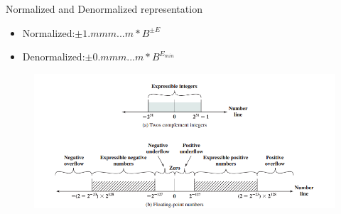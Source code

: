 \documentclass[11pt]{beamer}
\begin{document}
\begin{frame}{Normalized and Denormalized representation}
\begin{itemize}
\item Normalized:$\pm{1.mmm...m}*B^{\pm{E}}$\\
\item Denormalized:$\pm{0.mmm...m}*B^{E_{min}}$
\end{itemize}
\begin{center}
    \begin{figure}[htp]
    \begin{center}
     \includegraphics[scale=.5]{image/fig2}
    \end{center}
    \label{reffig2}
    \end{figure}
\end{center}
\end{frame}
\end{document}
